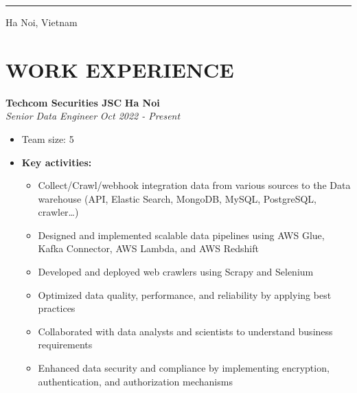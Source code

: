 \documentclass[11pt,a4paper,roman]{moderncv}
\newcommand*{\customcventry}[6][.25em]{%
    {\bfseries #4} \hfill {\bfseries #5} \\
    {\itshape #3} \hfill {\itshape #2}
    \ifx\relax#6\relax\else\\#6\fi
    \par\addvspace{#1}}
\begin{document}
    \makecvtitle
    \vspace*{-15mm}

    \begin{center}
        \begin{minipage}[t]{0.6\textwidth}
            \centering


            \vspace{3mm}
            \rule{0.8\textwidth}{0.5pt}
            \vspace{2mm}

            {\footnotesize {} Ha Noi, Vietnam}
        \end{minipage}
    \end{center}

    \vspace{5mm}

    \section{WORK EXPERIENCE}

    \customcventry{Oct 2022 - Present}{Senior Data Engineer}{Techcom Securities JSC}{Ha Noi}{}
    \begin{itemize}
        \item Team size: 5
        \item \textbf{Key activities:}
        \begin{itemize}
            \item Collect/Crawl/webhook integration data from various sources to the Data warehouse (API, Elastic Search, MongoDB, MySQL, PostgreSQL, crawler\ldots)
            \item Designed and implemented scalable data pipelines using AWS Glue, Kafka Connector, AWS Lambda, and AWS Redshift
            \item Developed and deployed web crawlers using Scrapy and Selenium
            \item Optimized data quality, performance, and reliability by applying best practices
            \item Collaborated with data analysts and scientists to understand business requirements
            \item Enhanced data security and compliance by implementing encryption, authentication, and authorization mechanisms
        \end{itemize}
    \end{itemize}
\end{document}
